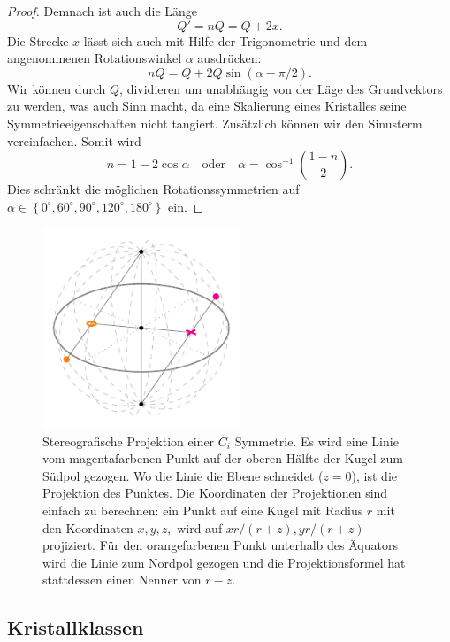 \begin{proof}
 Demnach ist auch die Länge
 \[
    Q' = nQ = Q + 2x .
 \]
 Die Strecke \(x\) lässt sich auch mit Hilfe der Trigonometrie und dem angenommenen Rotationswinkel \(\alpha\) ausdrücken:
 \[
    nQ = Q + 2Q\sin(\alpha - \pi/2) .
 \]
 Wir können durch \(Q\), dividieren um unabhängig von der Läge des Grundvektors zu werden, was auch Sinn macht, 
 da eine Skalierung eines Kristalles seine Symmetrieeigenschaften nicht tangiert.
 Zusätzlich können wir den Sinusterm vereinfachen. Somit wird
 \[
	 n = 1 - 2\cos\alpha \quad\text{oder}\quad
     \alpha = \cos^{-1}\left(\frac{1-n}{2}\right).
 \]
 Dies schränkt die möglichen Rotationssymmetrien auf 
 \(
     \alpha \in \left\{ 0^\circ, 60^\circ, 90^\circ, 120^\circ, 180^\circ\right\}
 \)
ein.
\end{proof}

\begin{figure}
    \centering
    \includegraphics[height=6cm]{papers/punktgruppen/figures/stereographic-projections}
    \caption{
      Stereografische Projektion einer \(C_{i}\) Symmetrie. Es wird eine Linie vom magentafarbenen Punkt auf der oberen Hälfte der Kugel zum Südpol gezogen.
      Wo die Linie die Ebene schneidet (\(z = 0\)), ist die Projektion des Punktes.
      Die Koordinaten der Projektionen sind einfach zu berechnen: ein Punkt auf eine Kugel mit Radius \(r\) mit den Koordinaten \(x, y, z,\) wird auf \(xr/(r + z), yr/(r + z)\) projiziert.
      Für den orangefarbenen Punkt unterhalb des Äquators wird die Linie zum Nordpol gezogen und die Projektionsformel hat stattdessen einen Nenner von \(r - z\).
    }
    \label{fig:punktgruppen:stereographic-projections}
\end{figure}

\subsection{Kristallklassen}
%

